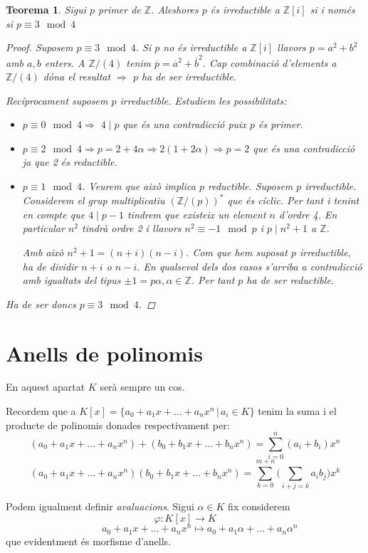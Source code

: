 \documentclass[a4paper,11pt]{report}
\newcommand{\barra}{\,|\,}
\renewcommand{\div}{\mid}
\renewcommand{\bar}{\overline}
\newcommand{\im}{\Rightarrow}
\theoremstyle{theorem}
\newtheorem{teorema}{\normalfont \sffamily\bfseries Teorema}[section]
\theoremstyle{definition}
\begin{document}
\begin{teorema}
	Sigui $p$ primer de $\mathbb{Z}$. Aleshores $p$ és irreductible a $\mathbb{Z}[i]$ si i només si $p\equiv 3 \mod 4$
	\begin{proof}
		Suposem $p\equiv 3 \mod 4$. Si $p$ no és irreductible a $\mathbb{Z}[i]$ llavors $p=a^2+b^2$ amb $a,b$ enters. A $\mathbb{Z}/(4)$ tenim $\bar{p}=\bar{a}^2+\bar{b}^2$. Cap combinació d'elements a $\mathbb{Z}/(4)$ dóna el resultat $\im$ $p$ ha de ser irreductible.
		
		Recíprocament suposem $p$ irreductible. Estudiem les possibilitats:
		\begin{itemize}
			\item $p\equiv 0 \mod 4\im$ $4\div p$ que és una contradicció puix $p$ és primer.
			\item $p\equiv 2 \mod 4\im p=2+4\alpha\im 2(1+2\alpha)\im p=2$ que és una contradicció ja que 2 és reductible.
			\item $p\equiv 1\mod 4$. Veurem que això implica $p$ reductible. Suposem $p$ irreductible. Considerem el grup multiplicatiu $(\mathbb{Z}/(p))^*$ que és cíclic. Per tant i tenint en compte que $4\div p-1$ tindrem que existeix un element $n$ d'ordre 4. En particular $n^2$ tindrà ordre 2 i llavors $n^2\equiv-1\mod p$ i $p\div n^2+1$ a $\mathbb{Z}$.
			
			Amb això $n^2+1=(n+i)(n-i)$. Com que hem suposat $p$ irreductible, ha de dividir $n+i$ o $n-i$. En qualsevol dels dos casos s'arriba a contradicció amb igualtats del tipus $\pm1=p\alpha,\alpha\in\mathbb{Z}$. Per tant $p$ ha de ser reductible.
			
		\end{itemize}
	Ha de ser doncs $p\equiv 3\mod 4$.
	\end{proof}
\end{teorema}
\section{Anells de polinomis}
En aquest apartat $K$ serà sempre un cos.

Recordem que a $K[x]=\{a_0+a_1x+\ldots+a_nx^n\barra a_i\in K\}$ tenim la suma i el producte de polinomis donades respectivament per:
$$(a_0+a_1x+\ldots+a_nx^n)+(b_0+b_1x+\ldots+b_nx^n)=\sum_{i=0}^{n}(a_i+b_i)x^n$$
$$(a_0+a_1x+\ldots+a_nx^n)(b_0+b_1x+\ldots+b_nx^n)=\sum_{k=0}^{m+n}\Big(\sum_{i+j=k} a_ib_j\Big)x^k$$

Podem igualment definir \emph{avaluacions}. Sigui $\alpha\in K$ fix considerem $$\varphi:K[x]\longrightarrow K$$
$$\qquad\quad a_0+a_1x+\ldots+a_nx^n\longmapsto a_0+a_1\alpha+\ldots+a_n\alpha^n$$
que evidentment és morfisme d'anells.
\end{document}
